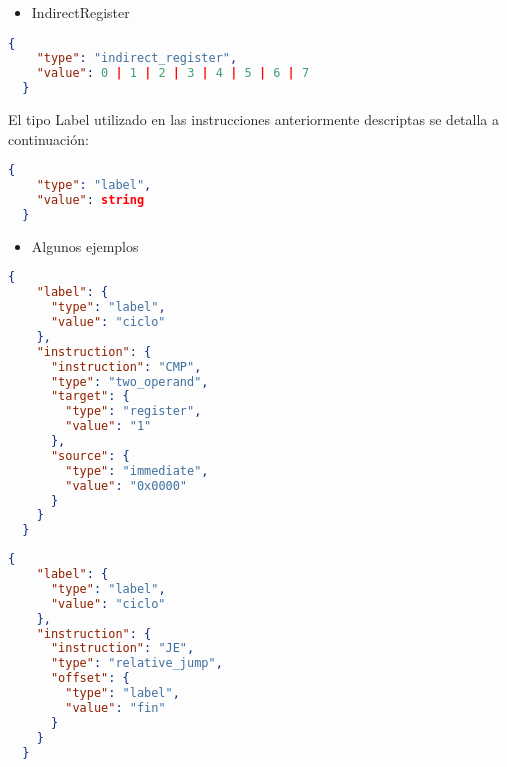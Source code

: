 \begin{itemize}
  \item IndirectRegister
\end{itemize}
\begin{minipage}{\textwidth} 
  \begin{lstlisting}[language=json,firstnumber=0]
  {
    "type": "indirect_register",
    "value": 0 | 1 | 2 | 3 | 4 | 5 | 6 | 7
  }
  \end{lstlisting}
\end{minipage}

El tipo Label utilizado en las instrucciones anteriormente descriptas se detalla a continuación:
\begin{minipage}{\textwidth} 
  \begin{lstlisting}[language=json,firstnumber=0]
  {
    "type": "label",
    "value": string
  }
  \end{lstlisting}
\end{minipage}


\begin{itemize}
  \item Algunos ejemplos
\end{itemize}

\begin{minipage}{\textwidth} 
  \begin{lstlisting}[language=json,firstnumber=0]
  {
    "label": {
      "type": "label",
      "value": "ciclo"
    },
    "instruction": {
      "instruction": "CMP",
      "type": "two_operand",
      "target": {
        "type": "register",
        "value": "1"
      },
      "source": {
        "type": "immediate",
        "value": "0x0000"
      }
    }
  }
  \end{lstlisting}
\end{minipage}

\begin{minipage}{\textwidth} 
  \begin{lstlisting}[language=json,firstnumber=0]
  {
    "label": {
      "type": "label",
      "value": "ciclo"
    },
    "instruction": {
      "instruction": "JE",
      "type": "relative_jump",
      "offset": {
        "type": "label",
        "value": "fin"
      }
    }
  }
  \end{lstlisting}
\end{minipage}
